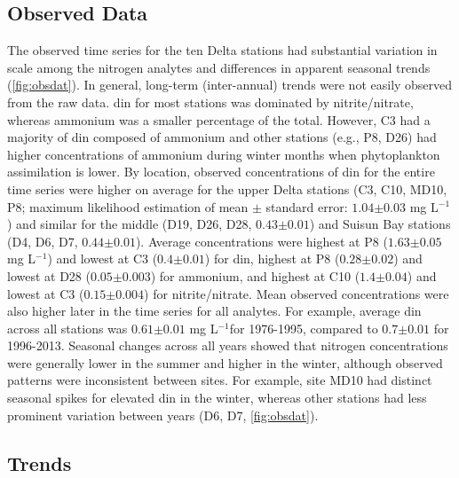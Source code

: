 \documentclass[journal = esthag, manuscript = article]{achemso}\usepackage[]{graphicx}\usepackage[]{color}
\newcommand{\mgl}{mg L$^{-1}$}
\begin{document}
\subsection{Observed Data}



The observed time series for the ten Delta stations had substantial variation in scale among the nitrogen analytes and differences in apparent seasonal trends (\cref{fig:obsdat}).  In general, long-term (inter-annual) trends were not easily observed from the raw data. \ac{din} for most stations was dominated by nitrite/nitrate, whereas ammonium was a smaller percentage of the total.  However, C3 had a majority of \ac{din} composed of ammonium and other stations (e.g., P8, D26) had higher concentrations of ammonium during winter months when phytoplankton assimilation is lower\cite{Novick15}.  By location, observed concentrations of \ac{din} for the entire time series were higher on average for the upper Delta stations (C3, C10, MD10, P8; maximum likelihood estimation of mean $\pm$ standard error: $1.04$$\pm$$0.03$ \mgl) and similar for the middle (D19, D26, D28, $0.43$$\pm$$0.01$) and Suisun Bay stations (D4, D6, D7, $0.44$$\pm$$0.01$).  Average concentrations were highest at P8 ($1.63$$\pm$$0.05$ \mgl) and lowest at C3 ($0.4$$\pm$$0.01$) for \ac{din}, highest at P8 ($0.28$$\pm$$0.02$) and lowest at D28 ($0.05$$\pm$$0.003$) for ammonium, and highest at C10 ($1.4$$\pm$$0.04$) and lowest at C3 ($0.15$$\pm$$0.004$) for nitrite/nitrate. Mean observed concentrations were also higher later in the time series for all analytes.  For example, average \ac{din} across all stations was $0.61$$\pm$$0.01$ \mgl for 1976-1995, compared to $0.7$$\pm$$0.01$ for 1996-2013. Seasonal changes across all years showed that nitrogen concentrations were generally lower in the summer and higher in the winter, although observed patterns were inconsistent between sites.  For example, site MD10 had distinct seasonal spikes for elevated \ac{din} in the winter, whereas other stations had less prominent variation between years (D6, D7, \cref{fig:obsdat}).  

\subsection{Trends}
\end{document}
